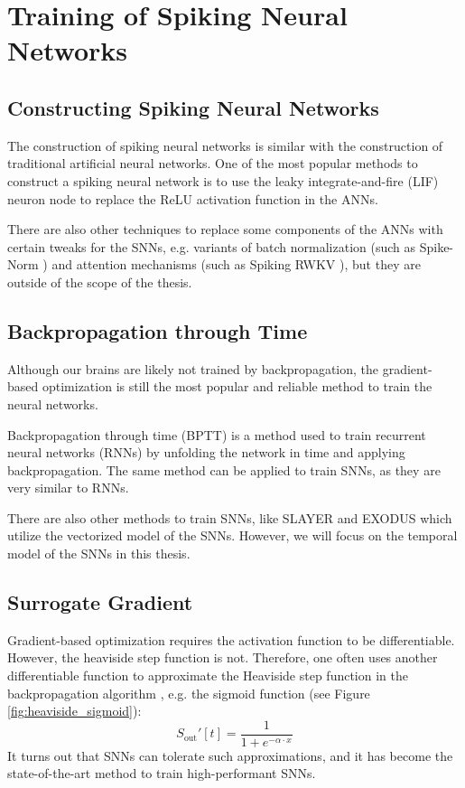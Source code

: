 \section{Training of Spiking Neural Networks}
\label{sec:snn_training}

    \subsection{Constructing Spiking Neural Networks}
    \label{subsec:snn_construct}
        The construction of spiking neural networks is similar with the construction of traditional artificial neural networks. One of the most popular methods to construct a spiking neural network is to use the leaky integrate-and-fire (LIF) neuron node to replace the ReLU activation function in the ANNs. 

        There are also other techniques to replace some components of the ANNs with certain tweaks for the SNNs, e.g. variants of batch normalization (such as Spike-Norm \cite{10.3389/fnins.2019.00095}) and attention mechanisms (such as Spiking RWKV \cite{zhu2024spikegptgenerativepretrainedlanguage}), but they are outside of the scope of the thesis. 

    \subsection{Backpropagation through Time}
    \label{subsec:snn_bptt}
        Although our brains are likely not trained by backpropagation, the gradient-based optimization is still the most popular and reliable method to train the neural networks. 

        Backpropagation through time (BPTT) is a method used to train recurrent neural networks (RNNs) by unfolding the network in time and applying backpropagation. The same method can be applied to train SNNs, as they are very similar to RNNs. 

        There are also other methods to train SNNs, like SLAYER \cite{Shrestha2018} and EXODUS \cite{bauer2022exodus} which utilize the vectorized model of the SNNs. However, we will focus on the temporal model of the SNNs in this thesis.

    \subsection{Surrogate Gradient}
    \label{subsec:lif_surrogate}
        Gradient-based optimization requires the activation function to be differentiable. However, the heaviside step function is not. Therefore, one often uses another differentiable function to approximate the Heaviside step function in the backpropagation algorithm \cite{8891809}, e.g. the sigmoid function (see Figure \ref{fig:heaviside_sigmoid}): 
        \begin{equation}
            S_{\text{out}}'[t] = \frac{1}{1 + e^{-\alpha \cdot x}}
        \end{equation}
        It turns out that SNNs can tolerate such approximations, and it has become the state-of-the-art method to train high-performant SNNs.
